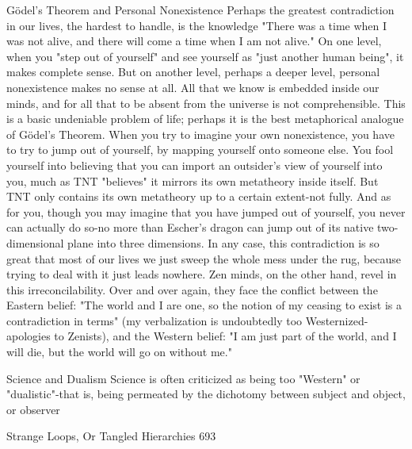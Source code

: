                  Gödel’s Theorem and Personal Nonexistence
Perhaps the greatest contradiction in our lives, the hardest to handle, is the knowledge
"There was a time when I was not alive, and there will come a time when I am not alive."
On one level, when you "step out of yourself" and see yourself as "just another human
being", it makes complete sense. But on another level, perhaps a deeper level, personal
nonexistence makes no sense at all. All that we know is embedded inside our minds, and
for all that to be absent from the universe is not comprehensible. This is a basic
undeniable problem of life; perhaps it is the best metaphorical analogue of Gödel’s
Theorem. When you try to imagine your own nonexistence, you have to try to jump out
of yourself, by mapping yourself onto someone else. You fool yourself into believing that
you can import an outsider's view of yourself into you, much as TNT "believes" it
mirrors its own metatheory inside itself. But TNT only contains its own metatheory up to
a certain extent-not fully. And as for you, though you may imagine that you have jumped
out of yourself, you never can actually do so-no more than Escher's dragon can jump out
of its native two-dimensional plane into three dimensions. In any case, this contradiction
is so great that most of our lives we just sweep the whole mess under the rug, because
trying to deal with it just leads nowhere.
        Zen minds, on the other hand, revel in this irreconcilability. Over and over again,
they face the conflict between the Eastern belief: "The world and I are one, so the notion
of my ceasing to exist is a contradiction in terms" (my verbalization is undoubtedly too
Westernized-apologies to Zenists), and the Western belief: "I am just part of the world,
and I will die, but the world will go on without me."

                                Science and Dualism
Science is often criticized as being too "Western" or "dualistic"-that is, being permeated
by the dichotomy between subject and object, or observer




Strange Loops, Or Tangled Hierarchies                                                  693

